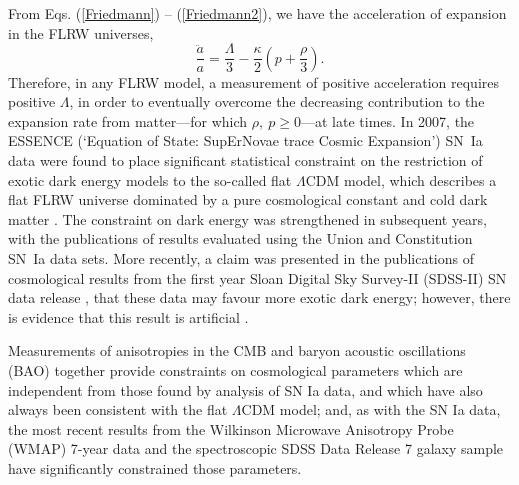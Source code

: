 From Eqs. (\ref{Friedmann}) -- (\ref{Friedmann2}), we have the acceleration of expansion in the FLRW universes,
\begin{equation}
\frac{\ddot{a}}{a}=\frac{\Lambda}{3}-\frac{\kappa}{2}\left(p+\frac{\rho}{3}\right).\label{ddot_a}
\end{equation}
Therefore, in any FLRW model, a measurement of positive acceleration requires positive $\Lambda$, in order to eventually overcome the decreasing contribution to the expansion rate from matter---for which $\rho,~p\geq0$---at late times. In 2007, the ESSENCE (`Equation of State: SupErNovae trace Cosmic Expansion') SN~Ia data were found to place significant statistical constraint on the restriction of exotic dark energy models to the so-called flat $\Lambda$CDM model, which describes a flat FLRW universe dominated by a pure cosmological constant and cold dark matter \cite{Wood-Vassey2007,Davis2007}. The constraint on dark energy was strengthened in subsequent years, with the publications of results evaluated using the Union \cite{Kowalski2008} and Constitution \cite{Hicken2009} SN~Ia data sets. More recently, a claim was presented in the publications of cosmological results from the first year Sloan Digital Sky Survey-II (SDSS-II) SN data release \cite{Kessler2009,Sollerman2009}, that these data may favour more exotic dark energy; however, there is evidence that this result is artificial \cite{Bueno2009}.

Measurements of anisotropies in the CMB and baryon acoustic oscillations (BAO) together provide constraints on cosmological parameters which are independent from those found by analysis of SN Ia data, and which have also always been consistent with the flat $\Lambda$CDM model; and, as with the SN Ia data, the most recent results from the Wilkinson Microwave Anisotropy Probe (WMAP) 7-year data \cite{Jarosik2011,Komatsu2011} and the spectroscopic SDSS Data Release 7 galaxy sample \cite{Percival2010} have significantly constrained those parameters.

